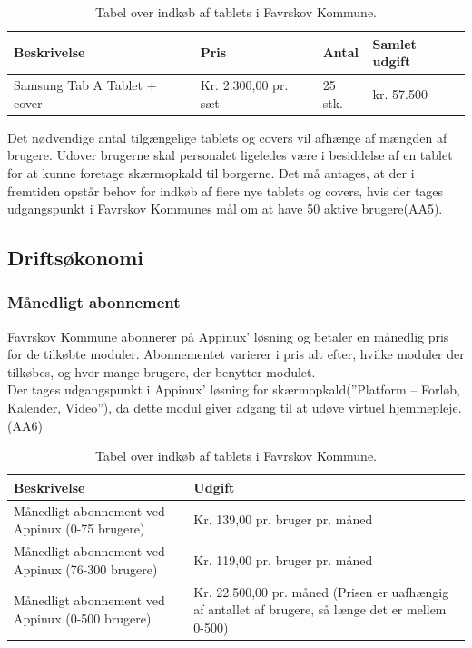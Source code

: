 \begin{table}[H]
	\caption{Tabel over indkøb af tablets i Favrskov Kommune.}
	\centering
	\label{tab:tabelindkoeb}
	\begin{tabular}{|l|l|l|l|}
		\hline
		\textbf{Beskrivelse} & \textbf{Pris} & \textbf{Antal} & \textbf{Samlet udgift}\\ \hline
		Samsung Tab A Tablet + cover & Kr. 2.300,00 pr. sæt & 25 stk. & kr. 57.500\\ \hline
	\end{tabular}
\end{table}
Det nødvendige antal tilgængelige tablets og covers vil afhænge af mængden af brugere. Udover brugerne skal personalet ligeledes være i besiddelse af en tablet for at kunne foretage skærmopkald til borgerne. Det må antages, at der i fremtiden opstår behov for indkøb af flere nye tablets og covers, hvis der tages udgangspunkt i Favrskov Kommunes mål om at have 50 aktive brugere(AA5).
\subsection{Driftsøkonomi}
\subsubsection{Månedligt abonnement}
Favrskov Kommune abonnerer på Appinux’ løsning og betaler en månedlig pris for de tilkøbte moduler. Abonnementet varierer i pris alt efter, hvilke moduler der tilkøbes, og hvor mange brugere, der benytter modulet.\\
Der tages udgangspunkt i Appinux’ løsning for skærmopkald(”Platform – Forløb, Kalender, Video”), da dette modul giver adgang til at udøve virtuel hjemmepleje.
(AA6)

\begin{table}[H]
	\caption{Tabel over indkøb af tablets i Favrskov Kommune.}
	\centering
	\label{tab:tabelmaanedudgift}
	\begin{tabularx}{\textwidth}{|X|X|}
		\hline
		\textbf{Beskrivelse} & \textbf{Udgift}\\ \hline
		Månedligt abonnement ved Appinux 
		(0-75 brugere)
		 & Kr. 139,00 pr. bruger pr. måned\\ 
		\hline
		Månedligt abonnement ved Appinux 
		(76-300 brugere)
		& Kr. 119,00 pr. bruger pr. måned\\ \hline
				Månedligt abonnement ved Appinux 
				(0-500 brugere)
				& Kr. 22.500,00 pr. måned (Prisen er uafhængig af antallet af brugere, så længe det er mellem 0-500)\\ \hline
	\end{tabularx}
\end{table}

